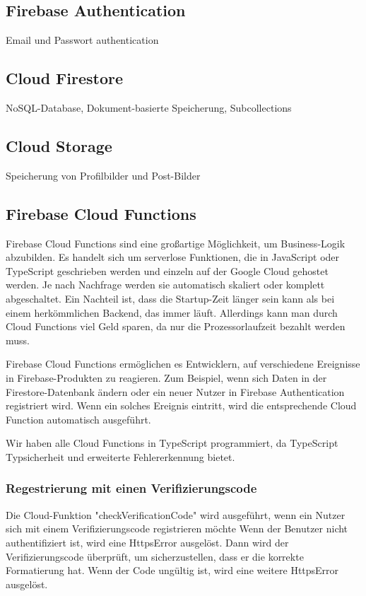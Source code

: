 \subsection{Firebase Authentication}
Email und Passwort authentication

\subsection{Cloud Firestore}
NoSQL-Database, Dokument-basierte Speicherung, Subcollections
\subsection{Cloud Storage}
Speicherung von Profilbilder und Post-Bilder
\subsection{Firebase Cloud Functions}
Firebase Cloud Functions sind eine großartige Möglichkeit,
um Business-Logik abzubilden. Es handelt sich um serverlose
Funktionen, die in JavaScript oder TypeScript geschrieben
werden und einzeln auf der Google Cloud gehostet werden. Je
nach Nachfrage werden sie automatisch skaliert oder komplett
abgeschaltet. Ein Nachteil ist, dass die Startup-Zeit länger
sein kann als bei einem herkömmlichen Backend, das immer
läuft. Allerdings kann man durch Cloud Functions viel Geld
sparen, da nur die Prozessorlaufzeit bezahlt werden muss.

Firebase Cloud Functions ermöglichen es Entwicklern, auf verschiedene Ereignisse in Firebase-Produkten zu reagieren. Zum Beispiel, wenn sich Daten in der Firestore-Datenbank ändern oder ein neuer Nutzer in Firebase Authentication registriert wird. Wenn ein solches Ereignis eintritt, wird die entsprechende Cloud Function automatisch ausgeführt.

Wir haben alle Cloud Functions in TypeScript programmiert,
da TypeScript Typsicherheit und erweiterte Fehlererkennung
bietet.


\subsubsection{Regestrierung mit einen Verifizierungscode}

Die Cloud-Funktion "checkVerificationCode" wird ausgeführt, wenn ein Nutzer sich mit einem Verifizierungscode registrieren möchte Wenn der Benutzer nicht authentifiziert ist, wird eine HttpsError ausgelöst. Dann wird der Verifizierungscode überprüft, um sicherzustellen, dass er die korrekte Formatierung hat. Wenn der Code ungültig ist, wird eine weitere HttpsError ausgelöst.

